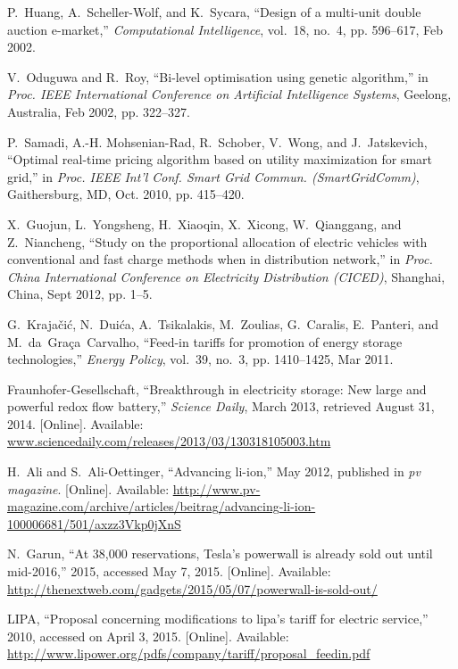 \documentclass[journal,10pt]{IEEEtran}
\begin{document}
\begin{thebibliography}{10}
P.~Huang, A.~Scheller-Wolf, and K.~Sycara, ``Design of a multi-unit double
  auction e-market,'' \emph{Computational Intelligence}, vol.~18, no.~4, pp.
  596--617, Feb 2002.

V.~Oduguwa and R.~Roy, ``Bi-level optimisation using genetic algorithm,'' in
  \emph{Proc. IEEE International Conference on Artificial Intelligence
  Systems}, Geelong, Australia, Feb 2002, pp. 322--327.

P.~Samadi, A.-H. Mohsenian-Rad, R.~Schober, V.~Wong, and J.~Jatskevich,
  ``Optimal real-time pricing algorithm based on utility maximization for smart
  grid,'' in \emph{Proc. IEEE Int'l Conf. Smart Grid Commun. (SmartGridComm)},
  Gaithersburg, MD, Oct. 2010, pp. 415--420.

X.~Guojun, L.~Yongsheng, H.~Xiaoqin, X.~Xicong, W.~Qianggang, and Z.~Niancheng,
  ``Study on the proportional allocation of electric vehicles with conventional
  and fast charge methods when in distribution network,'' in \emph{Proc. China
  International Conference on Electricity Distribution (CICED)}, Shanghai,
  China, Sept 2012, pp. 1--5.

G.~Kraja{\v{c}}i{\'{c}}, N.~Dui{\'{c}}a, A.~Tsikalakis, M.~Zoulias, G.~Caralis,
  E.~Panteri, and M.~da~Gra{\c{c}}a~Carvalho, ``Feed-in tariffs for promotion
  of energy storage technologies,'' \emph{Energy Policy}, vol.~39, no.~3, pp.
  1410--1425, Mar 2011.

\BIBentryALTinterwordspacing
{Fraunhofer-Gesellschaft}, ``Breakthrough in electricity storage: {N}ew large
  and powerful redox flow battery,'' \emph{Science Daily}, March 2013,
  retrieved August 31, 2014. [Online]. Available:
  \url{www.sciencedaily.com/releases/2013/03/130318105003.htm}
\BIBentrySTDinterwordspacing

\BIBentryALTinterwordspacing
H.~Ali and S.~Ali-Oettinger, ``Advancing li-ion,'' May 2012, published in
  \emph{pv magazine}. [Online]. Available:
  \url{http://www.pv-magazine.com/archive/articles/beitrag/advancing-li-ion-100006681/501/axzz3Vkp0jXnS}
\BIBentrySTDinterwordspacing

\BIBentryALTinterwordspacing
N.~Garun, ``{At 38,000 reservations, Tesla's powerwall is already sold out
  until mid-2016},'' 2015, accessed May 7, 2015. [Online]. Available:
  \url{http://thenextweb.com/gadgets/2015/05/07/powerwall-is-sold-out/}
\BIBentrySTDinterwordspacing

\BIBentryALTinterwordspacing
{LIPA}, ``Proposal concerning modifications to lipa's tariff for electric
  service,'' 2010, accessed on April 3, 2015. [Online]. Available:
  \url{http://www.lipower.org/pdfs/company/tariff/proposal\_feedin.pdf}
\BIBentrySTDinterwordspacing

\end{thebibliography}
\end{document}
